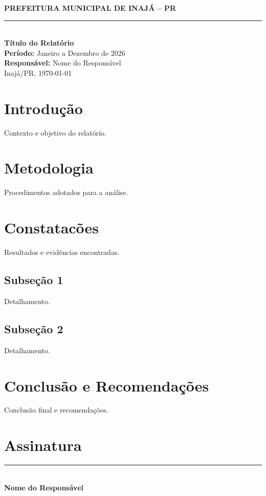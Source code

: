 \documentclass[12pt,a4paper]{article}
\newcommand{\municipio}{Inajá}
\newcommand{\uf}{PR}
\newcommand{\tituloRelatorio}{Título do Relatório}
\newcommand{\responsavel}{Nome do Responsável}
\newcommand{\periodo}{Janeiro a Dezembro de 2026}
\begin{document}
\begin{titlepage}
  \begin{center}
    \vspace*{3cm}
    {\large\textbf{PREFEITURA MUNICIPAL DE \MakeUppercase{\municipio} -- \uf}}\\[0.5cm]
    \rule{\textwidth}{0.4pt}\\[1cm]
    {\LARGE\textbf{\tituloRelatorio}}\\[1.5cm]
    {\large\textbf{Período:} \periodo}\\[0.5cm]
    {\large\textbf{Responsável:} \responsavel}\\[2cm]
    \vfill
    {\large \municipio/\uf, \today}
  \end{center}
\end{titlepage}

\tableofcontents
\newpage

\section{Introdução}

Contexto e objetivo do relatório.

\section{Metodologia}

Procedimentos adotados para a análise.

\section{Constatacões}

Resultados e evidências encontradas.

\subsection{Subseção 1}

Detalhamento.

\subsection{Subseção 2}

Detalhamento.

\section{Conclusão e Recomendações}

Conclusão final e recomendações.

\section{Assinatura}

\vspace{1cm}
\rule{6cm}{0.4pt}\\
\textbf{\responsavel}
\end{document}
